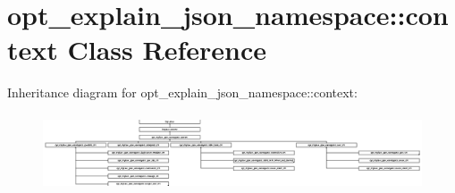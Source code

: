 \hypertarget{classopt__explain__json__namespace_1_1context}{}\section{opt\+\_\+explain\+\_\+json\+\_\+namespace\+:\+:context Class Reference}
\label{classopt__explain__json__namespace_1_1context}
Inheritance diagram for opt\+\_\+explain\+\_\+json\+\_\+namespace\+:\+:context\+:\begin{figure}[H]
\begin{center}
\leavevmode
\includegraphics[height=2.288828cm]{classopt__explain__json__namespace_1_1context}
\end{center}
\end{figure}
